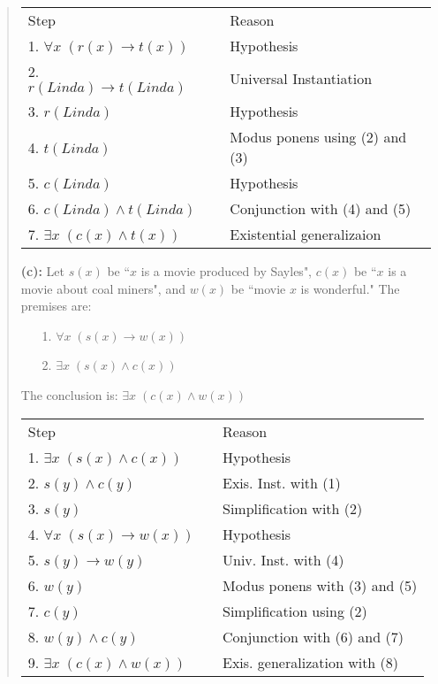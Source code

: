 \documentclass[12pt]{exam}
\begin{document}
\begin{questions}
\begin{solution}
\begin{quote}
    \smallskip
    \begin{tabular}{lll}
        Step        & \hspace{0.2in} & Reason \\
        1. $\forall x\; (r(x) \rightarrow t(x))$    &   & Hypothesis \\
        2. $r(Linda) \rightarrow t(Linda)$          &   & Universal Instantiation \\
        3. $r(Linda)$                               &   & Hypothesis \\
        4. $t(Linda)$                               &   & Modus ponens using (2) and (3) \\
        5. $c(Linda)$                               &   & Hypothesis \\
        6. $c(Linda) \wedge t(Linda)$               &   & Conjunction with (4) and (5) \\
        7. $\exists x\; (c(x) \wedge t(x))$         &   & Existential generalizaion \\
    \end{tabular}

    \medskip
    \textbf{(c):} Let $s(x)$ be ``$x$ is a movie produced by Sayles", $c(x)$ be ``$x$ is a movie about coal miners", and $w(x)$ be ``movie $x$ is wonderful."  The premises are:
    \begin{itemize}
        \item[1.] $\forall x\; (s(x) \rightarrow w(x))$
        \item[2.] $\exists x\; (s(x) \wedge c(x))$
    \end{itemize}
    The conclusion is: $\exists x\; (c(x) \wedge w(x))$

    \smallskip
    \begin{tabular}{lll}
        Step        & \hspace{0.2in} & Reason \\
        1. $\exists x\; (s(x) \wedge c(x))$  &   & Hypothesis \\
        2. $s(y) \wedge c(y)$               &   & Exis. Inst. with (1) \\
        3. $s(y)$                           &   & Simplification with (2) \\
        4. $\forall x\; (s(x) \rightarrow w(x))$ &  & Hypothesis \\
        5. $s(y) \rightarrow w(y)$          & & Univ. Inst. with (4) \\
        6. $w(y)$                           & & Modus ponens with (3) and (5) \\
        7. $c(y)$                           & & Simplification using (2) \\
        8. $w(y) \wedge c(y)$               & & Conjunction with (6) and (7) \\
        9. $\exists x\; (c(x) \wedge w(x))$ &   & Exis. generalization with (8) \\
    \end{tabular}
\end{quote}
\end{solution}



\end{questions}
\end{document}
